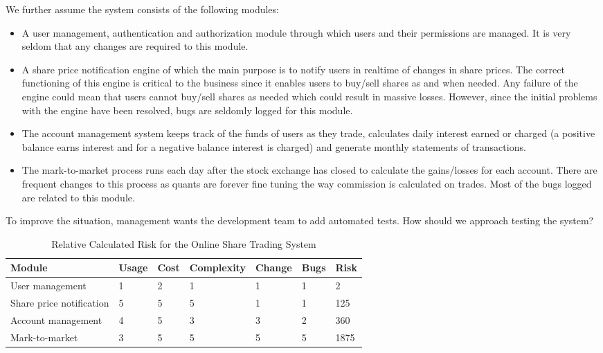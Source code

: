 \documentclass{amsart}
\begin{document}
We further assume the system consists of the following modules:

\begin{itemize}
	\item A user management, authentication and authorization module through which users and their permissions are managed. It is very seldom that any changes are required to this module.
	\item A share price notification engine of which the main purpose is to notify users in realtime of changes in share prices. The correct functioning of this engine is critical to the business since it enables users to buy/sell shares as and when needed. Any failure of the engine could mean that users cannot buy/sell shares as needed which could result in massive losses. However, since the initial problems with the engine have been resolved, bugs are seldomly logged for this module. 
	\item The account management system keeps track of the funds of users as they trade, calculates daily interest earned or charged (a positive balance earns interest and for a negative balance interest is charged) and generate monthly statements of transactions.
	\item The mark-to-market process runs each day after the stock exchange has closed to calculate the gains/losses for each account. There are frequent changes to this process as quants are forever fine tuning the way commission is calculated on trades. Most of the bugs logged are related to this module.
\end{itemize}



To improve the situation, management wants the development team to add automated tests. How should we approach testing the system?

\begin{table}
	\footnotesize
	\begin{center} 
		\caption{Relative Calculated Risk for the Online Share Trading System}
		\label{tab_Example1}
		\smallskip
		\begin{tabular}{|>{\footnotesize}p{3cm}|>{\footnotesize}p{0.75cm}|>{\footnotesize}p{0.75cm}|>{\footnotesize}p{1.75cm}|>{\footnotesize}p{1.25cm}|>{\footnotesize}p{0.75cm}|>{\footnotesize}p{0.75cm}|}
			\hline
			\textbf{Module} & \textbf{Usage} & \textbf{Cost} & \textbf{Complexity} & \textbf{Change} & \textbf{Bugs} & \textbf{Risk} \\
			\hline
			User management & 1 & 2 & 1 & 1 & 1 & 2\\
			Share price notification & 5 & 5 & 5 & 1 & 1 & 125 \\
			Account management & 4 & 5 & 3 & 3 & 2 & 360\\
			Mark-to-market & 3 & 5 & 5 & 5 & 5 & 1875\\
			\hline
		\end{tabular}
	\end{center}
	\normalsize
\end{table} 
\end{document}
